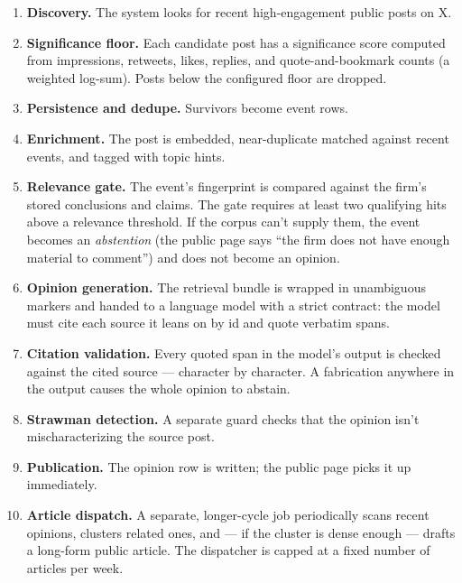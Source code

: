 \documentclass[11pt]{article}
\begin{document}
\begin{enumerate}[leftmargin=*,itemsep=0.2em]
  \item \textbf{Discovery.} The system looks for recent high-engagement
        public posts on X.
  \item \textbf{Significance floor.} Each candidate post has a
        significance score computed from impressions, retweets,
        likes, replies, and quote-and-bookmark counts (a weighted
        log-sum). Posts below the configured floor are dropped.
  \item \textbf{Persistence and dedupe.} Survivors become event rows.
  \item \textbf{Enrichment.} The post is embedded, near-duplicate
        matched against recent events, and tagged with topic hints.
  \item \textbf{Relevance gate.} The event's fingerprint is compared
        against the firm's stored conclusions and claims. The gate
        requires at least two qualifying hits above a relevance
        threshold. If the corpus can't supply them, the event becomes
        an \emph{abstention} (the public page says ``the firm does
        not have enough material to comment'') and does not become an
        opinion.
  \item \textbf{Opinion generation.} The retrieval bundle is wrapped
        in unambiguous markers and handed to a language model with a
        strict contract: the model must cite each source it leans on
        by id and quote verbatim spans.
  \item \textbf{Citation validation.} Every quoted span in the model's
        output is checked against the cited source --- character by
        character. A fabrication anywhere in the output causes the
        whole opinion to abstain.
  \item \textbf{Strawman detection.} A separate guard checks that the
        opinion isn't mischaracterizing the source post.
  \item \textbf{Publication.} The opinion row is written; the public
         page picks it up immediately.
  \item \textbf{Article dispatch.} A separate, longer-cycle job
        periodically scans recent opinions, clusters related ones,
        and --- if the cluster is dense enough --- drafts a long-form
        public article. The dispatcher is capped at a fixed number of
        articles per week.
\end{enumerate}
\end{document}
